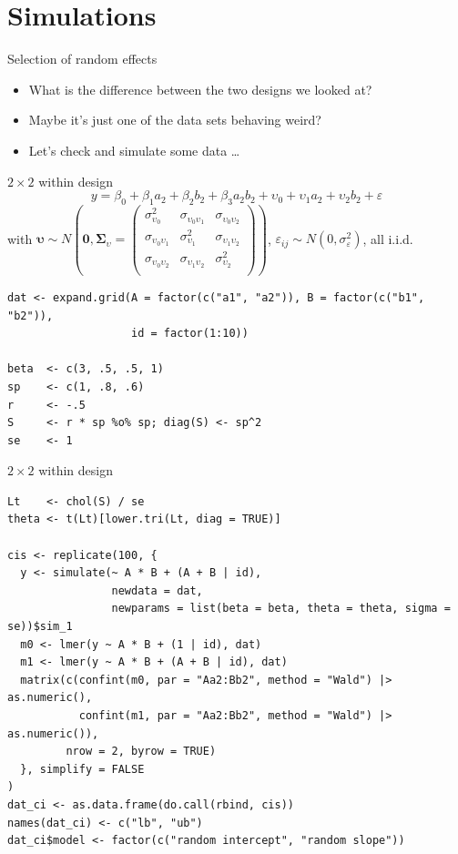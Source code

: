 \documentclass[aspectratio=169]{beamer}
\newcommand{\gvect}[1]{\boldsymbol{#1}}
\newcommand{\gmat}[1]{\boldsymbol{#1}}
\begin{document}
\section{Simulations}

\begin{frame}[<+->]{Selection of random effects}
  \begin{itemize}
    \item What is the difference between the two designs we looked at?
    \item Maybe it's just one of the data sets behaving weird?
    \item Let's check and simulate some data \dots
  \end{itemize}
\end{frame}

\begin{frame}[fragile]{$2\times 2$ within design}
  \[
    y = \beta_0 + \beta_1 a_2 + \beta_2 b_2 + \beta_3 a_2b_2 +
        \upsilon_0 + \upsilon_1 a_2 + \upsilon_2 b_2 + \varepsilon
  \]
  with $\gvect{\upsilon} \sim N\left(\gvect{0}, \gmat{\Sigma}_{\upsilon} = 
    \begin{pmatrix}
      \sigma^2_{\upsilon_0} & \sigma_{\upsilon_0\upsilon_1}  & \sigma_{\upsilon_0\upsilon_2}\\
      \sigma_{\upsilon_0\upsilon_1} & \sigma^2_{\upsilon_1}  & \sigma_{\upsilon_1\upsilon_2}\\
      \sigma_{\upsilon_0\upsilon_2} & \sigma_{\upsilon_1\upsilon_2} & \sigma^2_{\upsilon_2} \\
    \end{pmatrix}\right)$, $\varepsilon_{ij} \sim N(0, \sigma_{\varepsilon}^2)$,
    all i.i.d.
    \vspace{.5cm}
  \small
  \begin{lstlisting}
dat <- expand.grid(A = factor(c("a1", "a2")), B = factor(c("b1", "b2")),
                   id = factor(1:10))

beta  <- c(3, .5, .5, 1)
sp    <- c(1, .8, .6)
r     <- -.5
S     <- r * sp %o% sp; diag(S) <- sp^2
se    <- 1
  \end{lstlisting}
\end{frame}


\begin{frame}[fragile]{$2\times 2$ within design}
  \footnotesize
  \begin{lstlisting}
Lt    <- chol(S) / se
theta <- t(Lt)[lower.tri(Lt, diag = TRUE)]

cis <- replicate(100, {
  y <- simulate(~ A * B + (A + B | id),
                newdata = dat,
                newparams = list(beta = beta, theta = theta, sigma = se))$sim_1
  m0 <- lmer(y ~ A * B + (1 | id), dat)
  m1 <- lmer(y ~ A * B + (A + B | id), dat)
  matrix(c(confint(m0, par = "Aa2:Bb2", method = "Wald") |> as.numeric(),
           confint(m1, par = "Aa2:Bb2", method = "Wald") |> as.numeric()),
         nrow = 2, byrow = TRUE)
  }, simplify = FALSE
)
dat_ci <- as.data.frame(do.call(rbind, cis))
names(dat_ci) <- c("lb", "ub")
dat_ci$model <- factor(c("random intercept", "random slope"))
  \end{lstlisting}
\end{frame}
\end{document}
